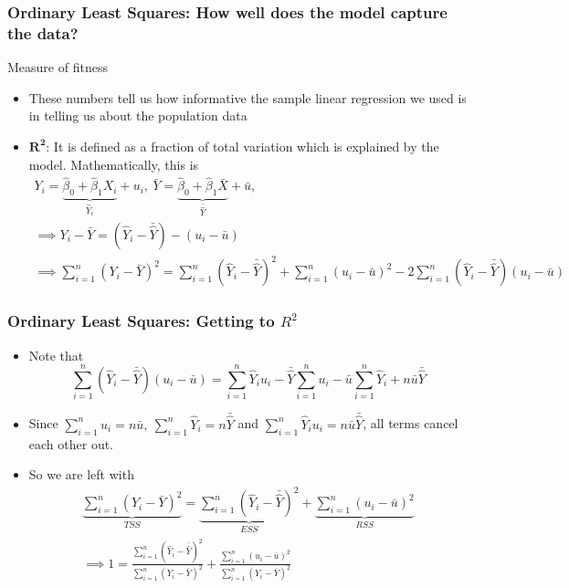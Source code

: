 \documentclass[aspectratio=169]{beamer}
\begin{document}
\begin{frame}
\frametitle{Ordinary Least Squares: How well does the model capture the data?}
Measure of fitness
\begin{itemize}
\item These numbers tell us how informative the sample linear regression we used is in telling us about the population data
\item $\mathbf{R^2}$: It is defined as a fraction of total variation which is explained by the model. Mathematically, this is
\footnotesize{%
\begin{gather*} 
Y_i = \underbrace{\hat{\beta}_0 + \hat{\beta}_1X_i}_{\hat{Y}_i} + u_i, \ \bar{Y} = \underbrace{\hat{\beta}_0 + \hat{\beta}_1\bar{X}}_{\bar{\hat{Y}}} + \bar{u}, \\
\implies Y_i-\bar{Y} = (\hat{Y}_i - \bar{\hat{Y}}) - (u_i - \bar{u}) \\
\implies \sum_{i=1}^n (Y_i-\bar{Y})^2= \sum_{i=1}^n (\hat{Y}_i - \bar{\hat{Y}})^2+\sum_{i=1}^n(u_i - \bar{u})^2 - 2\sum_{i=1}^n(\hat{Y}_i - \bar{\hat{Y}}) (u_i - \bar{u})
\end{gather*}}\normalsize
\end{itemize}
\end{frame}

\begin{frame}
\frametitle{Ordinary Least Squares: Getting to $R^2$}
\begin{itemize}
\item Note that 
\footnotesize{\[
\sum_{i=1}^n(\hat{Y}_i - \bar{\hat{Y}}) (u_i - \bar{u})=\sum_{i=1}^n\hat{Y}_i{u}_i-\bar{\hat{Y}}\sum_{i=1}^nu_i -\bar{u}\sum_{i=1}^n\hat{Y}_i +n\bar{u}\bar{\hat{Y}}
\]}\normalsize
\item Since $\sum_{i=1}^nu_i = n\bar{u},\ \sum_{i=1}^n\hat{Y}_i = n\bar{\hat{Y}}$ and $\sum_{i=1}^n\hat{Y}_iu_i=n\bar{u}\bar{\hat{Y}}$, all terms cancel each other out. 
\item So we are left with
\footnotesize{\begin{gather*}
\underbrace{\sum_{i=1}^n (Y_i-\bar{Y})^2}_{TSS}= \underbrace{\sum_{i=1}^n (\hat{Y}_i - \bar{\hat{Y}})^2}_{ESS}+\underbrace{\sum_{i=1}^n(u_i - \bar{u})^2}_{RSS} \\
\implies 1=\frac{\sum_{i=1}^n (\hat{Y}_i - \bar{\hat{Y}})^2}{\sum_{i=1}^n (Y_i-\bar{Y})^2} + \frac{\sum_{i=1}^n(u_i - \bar{u})^2 }{\sum_{i=1}^n (Y_i-\bar{Y})^2}
\end{gather*}}\normalsize
\end{itemize}
\end{frame}
\end{document}
